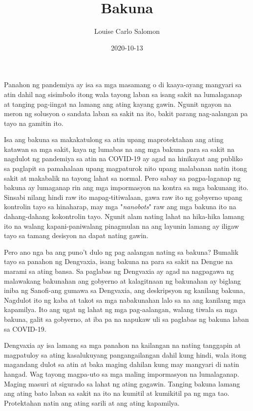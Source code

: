 \documentclass{article}
\title{Bakuna}
\date{2020-10-13}
\author{Louise Carlo Salomon}
\begin{document}
    \maketitle

    Panahon ng pandemiya ay isa sa mga masamang o di kaaya-ayang mangyari sa atin dahil nag sisimbolo itong wala tayong
    laban sa isang sakit na lumalaganap at tanging pag-iingat na lamang ang ating kayang gawin. Ngunit ngayon na meron 
    ng solusyon o sandata laban sa sakit na ito, bakit parang nag-aalangan pa tayo na gamitin ito. 
    \newline \par
    Isa ang bakuna sa makakatulong sa atin upang maprotektahan ang ating katawan sa mga sakit, kaya ng lumabas na ang 
    mga bakuna para sa sakit na nagdulot ng pandemiya sa atin na COVID-19 ay agad na hinikayat ang publiko sa paglapit 
    sa pamahalaan upang magpaturok nito upang malabanan natin itong sakit at makabalik na tayong lahat sa normal. Pero 
    sabay sa pagpa-laganap ng bakuna ay lumaganap rin ang mga impormasyon na kontra sa mga bakunang ito. Sinsabi nilang 
    hindi raw ito mapag-titiwalaan, gawa raw ito ng gobyerno upang kontrolin tayo sa hinaharap, may mga "\emph{nanobots}"
    raw ang mga bakuna ito na dahang-dahang kokontrolin tayo. Ngunit alam nating lahat na hika-hika lamang ito na walang
    kapani-paniwalang pinagmulan na ang layunin lamang ay iligaw tayo sa tamang desisyon na dapat nating gawin. 
    \newline \par
    Pero ano nga ba ang puno't dulo ng pag aalangan nating sa bakuna? Bumalik tayo sa panahon ng Dengvaxia, isang bakuna na
    para sa sakit na Dengue na marami sa ating bansa. Sa paglabas ng Dengvaxia ay agad na nagpagawa ng malawakang bakunahan
    ang gobyerno at kalagitnaan ng bakunahan ay biglang iniba ng Sanofi-ang gumawa sa Dengvaxia, ang deskripsyon ng kanilang 
    bakuna, Nagdulot ito ng kaba at takot sa mga nabakunahan lalo sa na ang kanilang mga kapamilya. Ito ang ugat ng lahat ng
    mga pag-aalangan, walang tiwala sa mga bakuna, galit sa gobyerno, at iba pa na napukaw uli sa paglabas ng bakuna laban sa
    COVID-19.
    \newline \par
    Dengvaxia ay isa lamang sa mga panahon na kailangan na nating tanggapin at magpatuloy sa ating kasalukuyang pangangailangan dahil
    kung hindi, wala itong magandang dulot sa atin at baka maging dahilan kung may mangyari di natin hangad. Wag tayong magpa-uto 
    sa mga maling impormasyon na lumalaganap. Maging masuri at sigurado sa lahat ng ating gagawin. Tanging bakuna lamang ang ating bato
    laban sa sakit na ito na kumitil at kumikitil pa ng mga tao. Protektahan natin ang ating sarili at ang ating kapamilya.  
\end{document}
